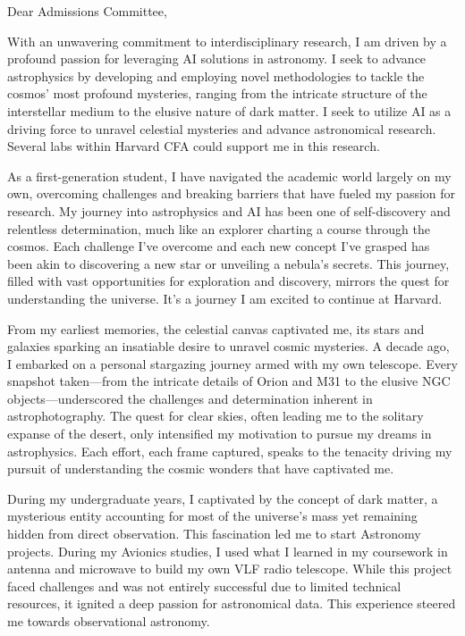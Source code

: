 \documentclass[a4,20pt]{article}
\begin{document}
\begin{large} 
Dear Admissions Committee,


With an unwavering commitment to interdisciplinary research, I am driven by a profound passion for leveraging AI solutions in astronomy. I seek to advance astrophysics by developing and employing novel methodologies to tackle the cosmos' most profound mysteries, ranging from the intricate structure of the interstellar medium to the elusive nature of dark matter. I seek to utilize AI as a driving force to unravel celestial mysteries and advance astronomical research. Several labs within Harvard CFA could support me in this research.


As a first-generation student, I have navigated the academic world largely on my own, overcoming challenges and breaking barriers that have fueled my passion for research. My journey into astrophysics and AI has been one of self-discovery and relentless determination, much like an explorer charting a course through the cosmos. Each challenge I’ve overcome and each new concept I’ve grasped has been akin to discovering a new star or unveiling a nebula's secrets. This journey, filled with vast opportunities for exploration and discovery, mirrors the quest for understanding the universe. It’s a journey I am excited to continue at Harvard.


From my earliest memories, the celestial canvas captivated me, its stars and galaxies sparking an insatiable desire to unravel cosmic mysteries. A decade ago, I embarked on a personal stargazing journey armed with my own telescope. Every snapshot taken—from the intricate details of Orion and M31 to the elusive NGC objects—underscored the challenges and determination inherent in astrophotography. The quest for clear skies, often leading me to the solitary expanse of the desert, only intensified my motivation to pursue my dreams in astrophysics. Each effort, each frame captured, speaks to the tenacity driving my pursuit of understanding the cosmic wonders that have captivated me.


During my undergraduate years, I captivated by the concept of dark matter, a mysterious entity accounting for most of the universe's mass yet remaining hidden from direct observation. This fascination led me to start Astronomy projects. During my Avionics studies, I used what I learned in my coursework in antenna and microwave to build my own VLF radio telescope. While this project faced challenges and was not entirely successful due to limited technical resources, it ignited a deep passion for astronomical data. This experience steered me towards observational astronomy.



\end{large}
\end{document}
